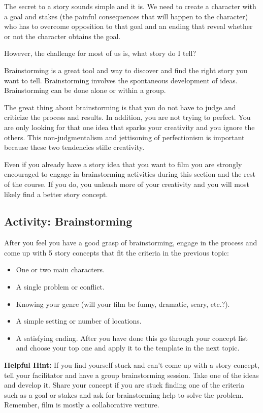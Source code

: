 \documentclass[
]{book}
\providecommand{\tightlist}{%
  \setlength{\itemsep}{0pt}\setlength{\parskip}{0pt}}
\begin{document}
The secret to a story sounds simple and it is. We need to create a character with a goal and stakes (the painful consequences that will happen to the character) who has to overcome opposition to that goal and an ending that reveal whether or not the character obtains the goal.

However, the challenge for most of us is, what story do I tell?

Brainstorming is a great tool and way to discover and find the right story you want to tell. Brainstorming involves the spontaneous development of ideas. Brainstorming can be done alone or within a group.

The great thing about brainstorming is that you do not have to judge and criticize the process and results. In addition, you are not trying to perfect. You are only looking for that one idea that sparks your creativity and you ignore the others. This non-judgmentalism and jettisoning of perfectionism is important because these two tendencies stifle creativity.

Even if you already have a story idea that you want to film you are strongly encouraged to engage in brainstorming activities during this section and the rest of the course. If you do, you unleash more of your creativity and you will most likely find a better story concept.

\hypertarget{activity-brainstorming}{%
\subsection*{Activity: Brainstorming}\label{activity-brainstorming}}

\begin{reflect}
After you feel you have a good grasp of brainstorming, engage in the process and come up with 5 story concepts that fit the criteria in the previous topic:

\begin{itemize}
\tightlist
\item
  One or two main characters.
\item
  A single problem or conflict.
\item
  Knowing your genre (will your film be funny, dramatic, scary, etc.?).
\item
  A simple setting or number of locations.
\item
  A satisfying ending. After you have done this go through your concept list and choose your top one and apply it to the template in the next topic.
\end{itemize}

\textbf{Helpful Hint:} If you find yourself stuck and can't come up with a story concept, tell your facilitator and have a group brainstorming session. Take one of the ideas and develop it. Share your concept if you are stuck finding one of the criteria such as a goal or stakes and ask for brainstorming help to solve the problem. Remember, film is mostly a collaborative venture.
\end{reflect}
\end{document}

